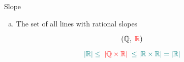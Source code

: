%
%

\begin{frame}{}
  \begin{exampleblock}{Slope}
    \begin{enumerate}[(a)]
      \item The set of all lines with rational slopes
    \end{enumerate}
  \end{exampleblock}

  \pause
  \[
    (\mathbb{Q}, \;\textcolor{red}{\mathbb{R}})
  \]

  \pause
  \[
    \textcolor{teal}{|\mathbb{R}| \le \;\textcolor{red}{|\mathbb{Q} \times \mathbb{R}|}\; \le |\mathbb{R} \times \mathbb{R}| = |\mathbb{R}|}
  \]
\end{frame}

